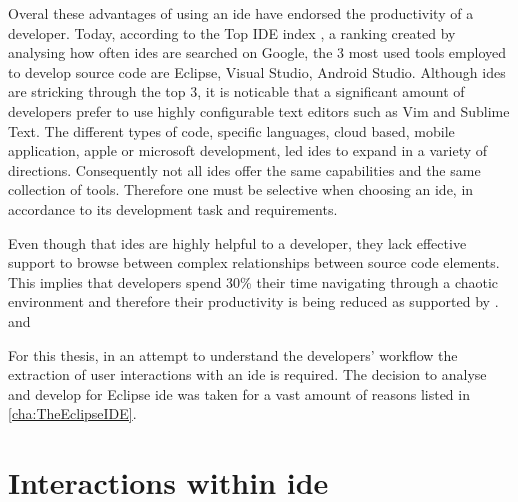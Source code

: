 Overal these advantages of using an \gls{ide} have endorsed the productivity of a developer. Today, according to the Top IDE index 
, a ranking created by analysing how often \gls{ide}s are searched on Google, the 3 most used tools employed to develop source code are Eclipse, Visual Studio, Android Studio. Although \gls{ide}s are stricking through the top 3, it is noticable that a significant amount of developers prefer to use highly configurable text editors such as Vim and Sublime Text. The different types of code, specific languages, cloud based, mobile application, apple or microsoft development, led \gls{ide}s to expand in a variety of directions. Consequently not all \gls{ide}s offer the same capabilities and the same collection of tools. Therefore one must be selective when choosing an \gls{ide}, in accordance to its development task and requirements. 

Even though that \gls{ide}s are highly helpful to a developer, they lack effective support to browse between complex relationships between source code elements. This implies that developers spend 30\% their time navigating through a chaotic environment and therefore their productivity is being reduced as supported by .  and 




For this thesis, in an attempt to understand the developers' workflow the extraction of user interactions with an \gls{ide} is required. The decision to analyse and develop for Eclipse \gls{ide} was taken for a vast amount of reasons listed in \ref{cha:TheEclipseIDE}.



\section{Interactions within \gls{ide}}

